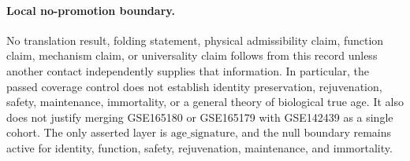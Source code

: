 \paragraph{Local no-promotion boundary.}
No translation result, folding statement, physical admissibility claim, function claim, mechanism claim, or universality claim follows from this record unless another contact independently supplies that information. In particular, the passed coverage control does not establish identity preservation, rejuvenation, safety, maintenance, immortality, or a general theory of biological true age. It also does not justify merging GSE165180 or GSE165179 with GSE142439 as a single cohort. The only asserted layer is $\mathrm{age\_signature}$, and the null boundary remains active for identity, function, safety, rejuvenation, maintenance, and immortality.
